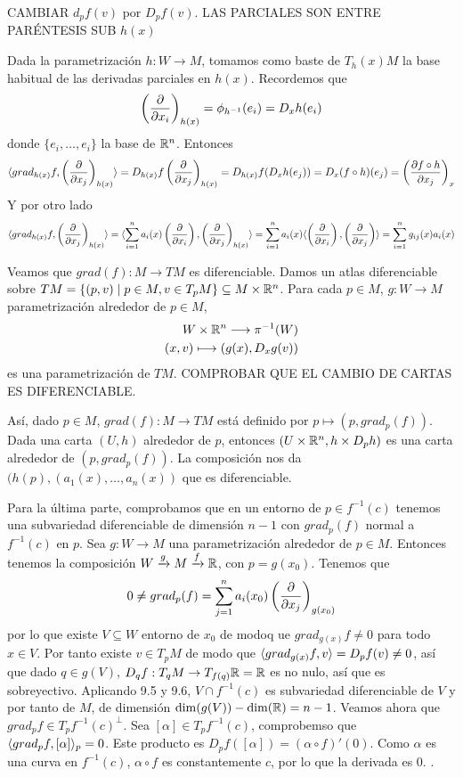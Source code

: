 \documentclass[twoside]{article}
\begin{document}
\begin{ejercicio}{9.14}
CAMBIAR $d_pf(v)$ por $D_pf(v)$. LAS PARCIALES SON ENTRE PARÉNTESIS SUB $h(x)$
\end{ejercicio}
\begin{solucion}
Dada la parametrización $h:W\to M$, tomamos como baste de $T_h(x)M$ la base habitual de las derivadas parciales en $h(x)$. Recordemos que
\[
\left(\frac{\partial }{\partial x_i}\right)_{h(x)}=\phi_{h^{-1}}(e_i)=D_xh(e_i)
\]
donde $\{e_i,\dots, e_i\}$ la base de $\mathbb{R}^n$. Entonces
\[
\langle{grad_{h(x)}f,\left(\frac{\partial }{\partial x_j}\right)_{h(x)}}\rangle=D_{h(x)}f\left(\frac{\partial }{\partial x_j}\right)_{h(x)}=D_{h(x)}f(D_xh(e_j))=D_x(f\circ h)(e_j)=\left(\frac{\partial f\circ h}{\partial x_j}\right)_x
\]
Y por otro lado 
\[
\langle{grad_{h(x)}f,\left(\frac{\partial }{\partial x_j}\right)_{h(x)}}\rangle=\langle{\sum_{i=1}^na_i(x)\left(\frac{\partial }{\partial x_i}\right),\left(\frac{\partial }{\partial x_j}\right)_{h(x)}}\rangle=\sum_{i=1}^na_i(x)\langle{\left(\frac{\partial }{\partial x_i}\right), \left(\frac{\partial }{\partial x_j}\right)}\rangle=\sum_{i=1}^n g_{ij}(x)a_i(x)
\]

Veamos que $grad(f):M\to TM$ es diferenciable. Damos un atlas diferenciable sobre $TM=\{(p,v)\mid p\in M, v\in T_pM\}\subseteq M\times
\mathbb{R}^n$. Para cada $p\in M$, $g:W\to M$ parametrización alrededor de $p\in M$, 
\begin{align*}
W\times\mathbb{R}^n\longrightarrow \pi^{-1}(W)\\
(x,v)\longmapsto (g(x), D_xg(v))
\end{align*}
es una parametrización de $TM$. COMPROBAR QUE EL CAMBIO DE CARTAS ES DIFERENCIABLE. 

Así, dado $p\in M$, $grad(f):M\to TM$ está definido por $p\mapsto (p,grad_p(f))$. Dada una carta $(U,h)$ alrededor de $p$, entonces $(U\times\mathbb{R}^n, h\times D_ph)$ es una carta alrededor de $(p,grad_p(f))$. La composición nos da $(h(p), (a_1(x),\dots, a_n(x))$ que es diferenciable. 

Para la última parte, comprobamos que en un entorno de $p\in f^{-1}(c)$ tenemos una subvariedad diferenciable de dimensión $n-1$ con $grad_p(f)$ normal a $f^{-1}(c)$ en $p$. Sea $g:W\to M$ una parametrización alrededor de $p\in M$.  Entonces tenemos la composición $W\xrightarrow{g}M\xrightarrow{f}\mathbb{R}$, con $p=g(x_0)$. Tenemos que
\[
0\neq grad_p(f)=\sum_{j=1}^na_i(x_0)\left(\frac{\partial }{\partial x_j}\right)_{g(x_0)}
\]
por lo que existe $V\subseteq W$ entorno de $x_0$ de modoq ue $grad_{g(x)}f\neq 0$ para todo $x\in V$. Por tanto existe $v\in T_pM$ de modo que $\langle{grad_{g(x)}f,v}\rangle=D_pf(v)\neq 0$, así que dado $q\in g(V)$, $D_qf:T_qM\to T_{f(q)}\mathbb{R}=\mathbb{R}$ es no nulo, así que es sobreyectivo. Aplicando 9.5 y 9.6, $V\cap f^{-1}(c)$ es subvariedad diferenciable de $V$ y por tanto de $M$, de dimensión $\dim(g(V))-\dim(\mathbb{R})=n-1$. Veamos ahora que $grad_pf\in T_pf^{-1}(c)^{\perp}$. Sea $[\alpha]\in T_pf^{-1}(c)$, comprobemso que $\langle{grad_pf,[\alpha]}\rangle_p=0$. Este producto es $D_pf([\alpha])=(\alpha\circ f)'(0)$. Como $\alpha$ es una curva en $f^{-1}(c)$, $\alpha\circ f$ es constantemente $c$, por lo que la derivada es 0. 
. 
\end{solucion}
\newpage
\end{document}
